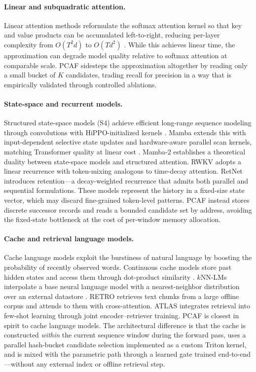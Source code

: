 \documentclass{article}
\begin{document}
\paragraph{Linear and subquadratic attention.}
Linear attention methods reformulate the softmax attention kernel so that key
and value products can be accumulated left-to-right, reducing per-layer
complexity from $O(T^2 d)$ to $O(T d^2)$
\citep{katharopoulos2020linearattn}. While this achieves linear time, the
approximation can degrade model quality relative to softmax attention at
comparable scale. PCAF sidesteps the approximation altogether by reading only a
small bucket of $K$ candidates, trading recall for precision in a way that is
empirically validated through controlled ablations.

\paragraph{State-space and recurrent models.}
Structured state-space models (S4) achieve efficient long-range sequence
modeling through convolutions with HiPPO-initialized kernels
\citep{gu2021s4}. Mamba extends this with input-dependent selective state
updates and hardware-aware parallel scan kernels, matching Transformer quality
at linear cost \citep{gu2023mamba}. Mamba-2 \citep{dao2024mamba2} establishes
a theoretical duality between state-space models and structured attention.
RWKV \citep{peng2023rwkv} adopts a linear recurrence with token-mixing
analogous to time-decay attention. RetNet \citep{sun2023retnet} introduces
retention—a decay-weighted recurrence that admits both parallel and sequential
formulations. These models represent the history in a fixed-size state vector,
which may discard fine-grained token-level patterns. PCAF instead stores
discrete successor records and reads a bounded candidate set by address,
avoiding the fixed-state bottleneck at the cost of per-window memory
allocation.

\paragraph{Cache and retrieval language models.}
Cache language models exploit the burstiness of natural language by boosting
the probability of recently observed words. Continuous cache models store past
hidden states and access them through dot-product similarity
\citep{grave2016continuous}. $k$NN-LMs interpolate a base neural language model
with a nearest-neighbor distribution over an external datastore
\citep{khandelwal2019knn}. RETRO \citep{borgeaud2022retro} retrieves
text chunks from a large offline corpus and attends to them with
cross-attention. ATLAS \citep{izacard2022atlas} integrates retrieval into
few-shot learning through joint encoder–retriever training. PCAF is closest in
spirit to cache language models. The architectural difference is that the cache
is constructed \emph{within} the current sequence window during the forward
pass, uses a parallel hash-bucket candidate selection implemented as a custom
Triton kernel, and is mixed with the parametric path through a learned gate
trained end-to-end—without any external index or offline retrieval step.
\end{document}
